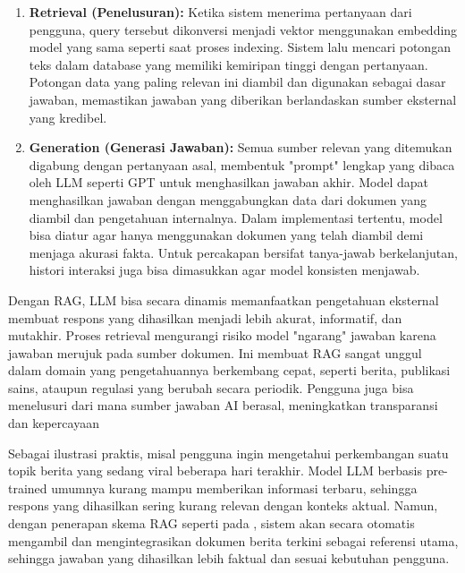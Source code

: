 \begin{subsectcontent}
\begin{enumerate}
			\item \textbf{Retrieval (Penelusuran):} Ketika sistem menerima pertanyaan dari pengguna, query tersebut dikonversi menjadi vektor menggunakan embedding model yang sama seperti saat proses indexing. Sistem lalu mencari potongan teks dalam database yang memiliki kemiripan tinggi dengan pertanyaan. Potongan data yang paling relevan ini diambil dan digunakan sebagai dasar jawaban, memastikan jawaban yang diberikan berlandaskan sumber eksternal yang kredibel.
			\item \textbf{Generation (Generasi Jawaban):} Semua sumber relevan yang ditemukan digabung dengan pertanyaan asal, membentuk "prompt" lengkap yang dibaca oleh LLM seperti GPT untuk menghasilkan jawaban akhir. Model dapat menghasilkan jawaban dengan menggabungkan data dari dokumen yang diambil dan pengetahuan internalnya. Dalam implementasi tertentu, model bisa diatur agar hanya menggunakan dokumen yang telah diambil demi menjaga akurasi fakta. Untuk percakapan bersifat tanya-jawab berkelanjutan, histori interaksi juga bisa dimasukkan agar model konsisten menjawab.
		\end{enumerate}
		
		\FloatBarrier
		
		Dengan RAG, LLM bisa secara dinamis memanfaatkan pengetahuan eksternal membuat respons yang dihasilkan menjadi lebih akurat, informatif, dan mutakhir. Proses retrieval mengurangi risiko model "ngarang" jawaban karena jawaban merujuk pada sumber dokumen. Ini membuat RAG sangat unggul dalam domain yang pengetahuannya berkembang cepat, seperti berita, publikasi sains, ataupun regulasi yang berubah secara periodik. Pengguna juga bisa menelusuri dari mana sumber jawaban AI berasal, meningkatkan transparansi dan kepercayaan
		
		Sebagai ilustrasi praktis, misal pengguna ingin mengetahui perkembangan suatu topik berita yang sedang viral beberapa hari terakhir. Model LLM berbasis pre-trained umumnya kurang mampu memberikan informasi terbaru, sehingga respons yang dihasilkan sering kurang relevan dengan konteks aktual. Namun, dengan penerapan skema RAG seperti pada , sistem akan secara otomatis mengambil dan mengintegrasikan dokumen berita terkini sebagai referensi utama, sehingga jawaban yang dihasilkan lebih faktual dan sesuai kebutuhan pengguna.


\end{subsectcontent}

